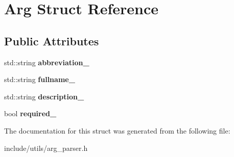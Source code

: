 \hypertarget{struct_arg}{}\section{Arg Struct Reference}
\label{struct_arg}
\subsection*{Public Attributes}
\begin{DoxyCompactItemize}
\item 
\mbox{\label{struct_arg_a9aff989efba71e800c3351e1ca9781b3}} 
std\+::string {\bfseries abbreviation\+\_\+}
\item 
\mbox{\label{struct_arg_a67c621569e9fcc3183afc7b598f28a9a}} 
std\+::string {\bfseries fullname\+\_\+}
\item 
\mbox{\label{struct_arg_a3c314682393cf5618a547f9a4cd3c9ac}} 
std\+::string {\bfseries description\+\_\+}
\item 
\mbox{\label{struct_arg_acab62a6fb37ee5488764848f781274cd}} 
bool {\bfseries required\+\_\+}
\end{DoxyCompactItemize}


The documentation for this struct was generated from the following file\+:\begin{DoxyCompactItemize}
\item 
include/utils/arg\+\_\+parser.\+h\end{DoxyCompactItemize}
